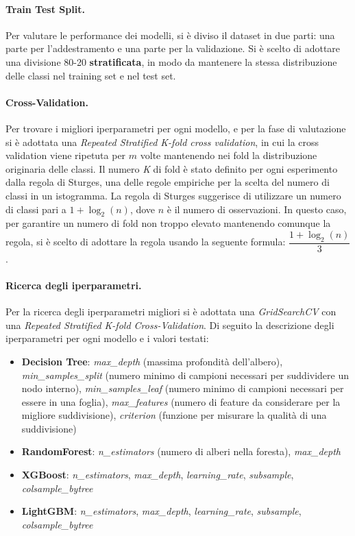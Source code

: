 \paragraph{Train Test Split.} Per valutare le performance dei modelli, si è diviso il dataset in due parti: una parte per l'addestramento e una parte per la validazione. Si è scelto di adottare una divisione 80-20 \textbf{stratificata}, in modo da mantenere la stessa distribuzione delle classi nel training set e nel test set.
\paragraph{Cross-Validation.} Per trovare i migliori iperparametri per ogni modello, e per la fase di valutazione si è adottata una \textit{Repeated Stratified K-fold cross validation}, in cui la cross validation viene ripetuta per $m$ volte mantenendo nei fold la distribuzione originaria delle classi. Il numero \textit{K} di fold è stato definito per ogni esperimento dalla regola di Sturges, una delle regole empiriche per la scelta del numero di classi in un istogramma. La regola di Sturges suggerisce di utilizzare un numero di classi pari a $1 + \log_2(n)$, dove $n$ è il numero di osservazioni. In questo caso, per garantire un numero di fold non troppo elevato mantenendo comunque la regola, si è scelto di adottare la regola usando la seguente formula: $\dfrac{1 + \log_2(n)}{3}$.
\paragraph{Ricerca degli iperparametri.} Per la ricerca degli iperparametri migliori si è adottata una \textit{GridSearchCV} con una \textit{Repeated Stratified K-fold Cross-Validation}. Di seguito la descrizione degli iperparametri per ogni modello e i valori testati:
\begin{itemize}[label=-]
    \item \textbf{Decision Tree}: \textit{max\_depth} (massima profondità dell'albero), \textit{min\_samples\_split} (numero minimo di campioni necessari per suddividere un nodo interno), \textit{min\_samples\_leaf} (numero minimo di campioni necessari per essere in una foglia), \textit{max\_features} (numero di feature da considerare per la migliore suddivisione), \textit{criterion} (funzione per misurare la qualità di una suddivisione)
    \item \textbf{RandomForest}: \textit{n\_estimators} (numero di alberi nella foresta), \textit{max\_depth}
    \item \textbf{XGBoost}: \textit{n\_estimators}, \textit{max\_depth}, \textit{learning\_rate}, \textit{subsample}, \textit{colsample\_bytree}
    \item \textbf{LightGBM}: \textit{n\_estimators}, \textit{max\_depth}, \textit{learning\_rate}, \textit{subsample}, \textit{colsample\_bytree}
\end{itemize}
